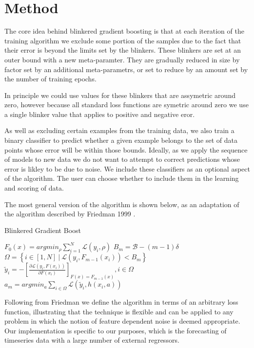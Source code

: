 \documentclass[11pt,twoside,a4paper]{article}
\begin{document}
\section{Method}

The core idea behind blinkered gradient boosting is that at each iteration of the training
algorithm we exclude some portion of the samples due to the fact that their error is beyond
the limits set by the blinkers. These blinkers are set at an outer bound with a new meta-paramter.
They are gradually reduced in size by factor set by an additional meta-parametrs, or set to 
reduce by an amount set by the number of training epochs.

In principle we could use values for these blinkers that are assymetric around zero, however because
all standard loss functions are symetric around zero we use a single blinker value that applies to positive
and negative eror.

As well as excluding certain examples from the training data, we also train a binary classifier
to predict whether a given example belongs to the set of data points whose error will be within those
bounds. Ideally, as we apply the sequence of models to new data we do not want to attempt to correct
predictions whose error is likley to be due to noise. We include these classifiers as an optional
aspect of the algorithm. The user can choose whether to include them in the learning and scoring
of data.

The most general version of the algorithm is shown below, as an adaptation of the algorithm described by
Friedman 1999 \cite{firedman_1999}.


\begin{algorithm}
\caption{Blinkered Gradient Boost}\label{bgm}
\begin{algorithmic}[1]
\State $\displaystyle F_0(x) = arg min_{\rho} \sum_{i=1}^N \mathcal{L}(y_i, \rho) $
\State $B_m = \mathcal{B} - (m-1)\delta $
\State $\displaystyle \Omega = \left\{ i \in [1,N] \ | \ \mathcal{L}(y_i, F_{m-1}(x_i)) < B_m \right\} $
\State $\displaystyle \tilde{y}_i = - \left[ \frac{\partial \mathcal{L}(y_i, F(x_i)) }{\partial  F(x_i)} \right]_{F(x) =F_{m-1}(x)}, i \in \Omega  $
\State $\displaystyle a_m = arg min_a \sum_{i \in \Omega} \mathcal{L}(\tilde{y}_i, h(x_i, a)) $
\EndFor
\end{algorithmic}
\end{algorithm}

 
Following from Friedman we define the algorithm in terms of an arbitrary loss function, illustrating
that the technique is flexible and can be applied to any problem in which the notion of feature dependent
noise is deemed appropriate. Our implementation is specific to our purposes, which is the forecasting
of timeseries data with a large number of external regressors.
\end{document}
